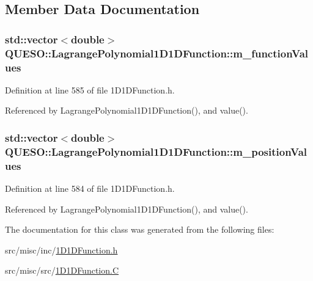 \subsection{Member Data Documentation}
\hypertarget{class_q_u_e_s_o_1_1_lagrange_polynomial1_d1_d_function_aa6dc315c563b9b83a88cd3f280a75aa4}{
\subsubsection[{m\-\_\-function\-Values}]{\setlength{\rightskip}{0pt plus 5cm}std\-::vector$<$double$>$ Q\-U\-E\-S\-O\-::\-Lagrange\-Polynomial1\-D1\-D\-Function\-::m\-\_\-function\-Values\hspace{0.3cm}{\ttfamily [protected]}}}\label{class_q_u_e_s_o_1_1_lagrange_polynomial1_d1_d_function_aa6dc315c563b9b83a88cd3f280a75aa4}


Definition at line 585 of file 1\-D1\-D\-Function.\-h.



Referenced by Lagrange\-Polynomial1\-D1\-D\-Function(), and value().

\hypertarget{class_q_u_e_s_o_1_1_lagrange_polynomial1_d1_d_function_a192c6dcd8bdba6177830fc1398ce5b01}{
\subsubsection[{m\-\_\-position\-Values}]{\setlength{\rightskip}{0pt plus 5cm}std\-::vector$<$double$>$ Q\-U\-E\-S\-O\-::\-Lagrange\-Polynomial1\-D1\-D\-Function\-::m\-\_\-position\-Values\hspace{0.3cm}{\ttfamily [protected]}}}\label{class_q_u_e_s_o_1_1_lagrange_polynomial1_d1_d_function_a192c6dcd8bdba6177830fc1398ce5b01}


Definition at line 584 of file 1\-D1\-D\-Function.\-h.



Referenced by Lagrange\-Polynomial1\-D1\-D\-Function(), and value().



The documentation for this class was generated from the following files\-:\begin{DoxyCompactItemize}
\item 
src/misc/inc/\hyperlink{1_d1_d_function_8h}{1\-D1\-D\-Function.\-h}\item 
src/misc/src/\hyperlink{1_d1_d_function_8_c}{1\-D1\-D\-Function.\-C}\end{DoxyCompactItemize}
